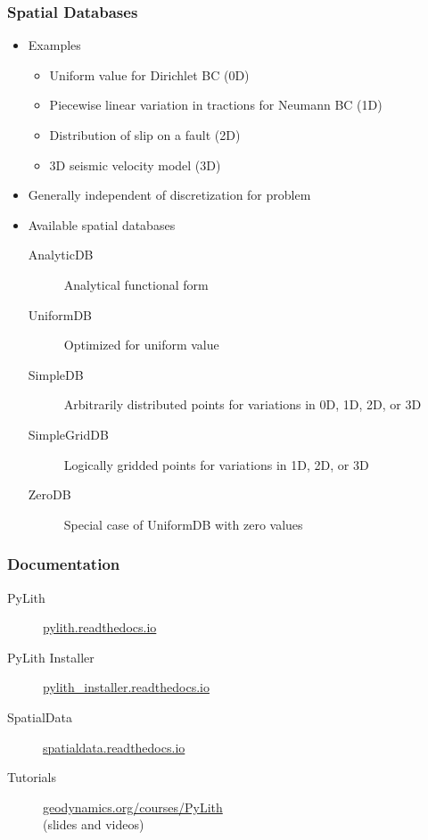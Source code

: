 \documentclass[aspectratio=169]{beamer}
\begin{document}
\begin{frame}
  \frametitle{Spatial Databases}

  \begin{itemize}
 \item Examples
    \begin{itemize}
    \item Uniform value for Dirichlet BC (0D)
    \item Piecewise linear variation in tractions for Neumann BC (1D)
    \item Distribution of slip on a fault (2D)
    \item 3D seismic velocity model (3D)
    \end{itemize}\pause
  \item Generally independent of discretization for problem\pause
  \item Available spatial databases
    \begin{description}
    \item[AnalyticDB] Analytical functional form
    \item[UniformDB] Optimized for uniform value
    \item[SimpleDB] Arbitrarily distributed points for variations in 0D, 1D, 2D, or 3D
    \item[SimpleGridDB] Logically gridded points for variations in 1D, 2D, or 3D
    \item[ZeroDB] Special case of UniformDB with zero values
    \end{description}
 \end{itemize}

\end{frame}


\begin{frame}
  \frametitle{Documentation}

  \begin{description}
  \item[PyLith] \url{pylith.readthedocs.io}
  \item[PyLith Installer] \url{pylith_installer.readthedocs.io}
  \item[SpatialData] \url{spatialdata.readthedocs.io}
  \item[Tutorials] \url{geodynamics.org/courses/PyLith}\\
    (slides and videos)
  \end{description}

  \vfill
  
\end{frame}
\end{document}
